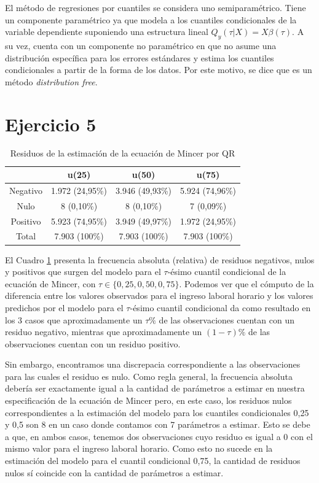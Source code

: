 \documentclass[11pt]{article}
\begin{document}
El método de regresiones por cuantiles se considera uno semiparamétrico. Tiene un componente paramétrico ya que modela a los cuantiles condicionales de la variable dependiente suponiendo una estructura lineal $Q_y(\tau | X ) = X \beta(\tau)$. A su vez, cuenta con un componente no paramétrico en que no asume una distribución específica para los errores estándares y estima los cuantiles condicionales a partir de la forma de los datos. Por este motivo, se dice que es un método \textit{distribution free}.

\section*{Ejercicio 5}

\begin{table}[H]
    \centering
     \caption{Residuos de la estimación de la ecuación de Mincer por QR}
    \begin{tabular}{|c|c|c|c|}
    \hline
         & \textbf{u(25)} & \textbf{u(50)} & \textbf{u(75)}\\ \hline
    Negativo & 1.972 (24,95\%) & 3.946 (49,93\%) & 5.924 (74,96\%) \\
    Nulo     & 8 (0,10\%) & 8 (0,10\%) & 7 (0,09\%) \\
    Positivo & 5.923 (74,95\%) & 3.949 (49,97\%) & 1.972 (24,95\%) \\ \hline
    Total    & 7.903 (100\%) & 7.903 (100\%) & 7.903 (100\%) \\ \hline
    \end{tabular}
    \label{tab:residuos_QR}
\end{table}

El Cuadro \ref{tab:residuos_QR} presenta la frecuencia absoluta (relativa) de residuos negativos, nulos y positivos que surgen del modelo para el $\tau$-ésimo cuantil condicional de la ecuación de Mincer, con $\tau\in\{0,25,0,50,0,75\}$. Podemos ver que el cómputo de la diferencia entre los valores observados para el ingreso laboral horario y los valores predichos por el modelo para el $\tau$-ésimo cuantil condicional da como resultado en los 3 casos que aproximadamente un $\tau\%$ de las observaciones cuentan con un residuo negativo, mientras que aproximadamente un $(1-\tau)\%$ de las observaciones cuentan con un residuo positivo. 

Sin embargo, encontramos una discrepacia correspondiente a las observaciones para las cuales el residuo es nulo. Como regla general, la frecuencia absoluta debería ser exactamente igual a la cantidad de parámetros a estimar en nuestra especificación de la ecuación de Mincer pero, en este caso, los residuos nulos correspondientes a la estimación del modelo para los cuantiles condicionales 0,25 y 0,5 son 8 en un caso donde contamos con 7 parámetros a estimar. Esto se debe a que, en ambos casos, tenemos dos observaciones cuyo residuo es igual a 0 con el mismo valor para el ingreso laboral horario. Como esto no sucede en la estimación del modelo para el cuantil condicional 0,75, la cantidad de residuos nulos sí coincide con la cantidad de parámetros a estimar.
\end{document}
